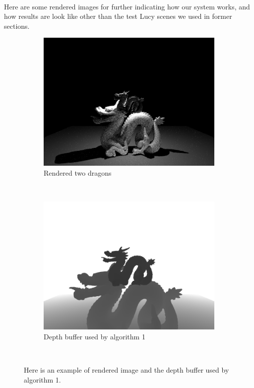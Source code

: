 \documentclass[a4paper, oneside, 10pt]{article}
\begin{document}
\paragraph{}Here are some rendered images for further indicating how our system works, and how results are look like other than the test Lucy scenes we used in former sections.
\begin{figure}[h]
	\centering
        \begin{subfigure}[b]{0.5\textwidth}
                \includegraphics[width=\textwidth]{2dragons}
                \caption{Rendered two dragons}
                \label{fig:2dragons}
        \end{subfigure}%
        ~ %
        \begin{subfigure}[b]{0.5\textwidth}
                \includegraphics[width=\textwidth]{depth}
                \caption{Depth buffer used by algorithm 1}
                \label{fig:depthbuffer}
        \end{subfigure}
  		\caption{Here is an example of rendered image and the depth buffer used by algorithm 1.}\
\end{figure}
\end{document}
